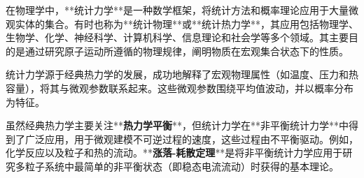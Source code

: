

在物理学中，**统计力学**是一种数学框架，将统计方法和概率理论应用于大量微观实体的集合。有时也称为**统计物理**或**统计热力学**，其应用包括物理学、生物学、化学、神经科学、计算机科学、信息理论和社会学等多个领域。其主要目的是通过研究原子运动所遵循的物理规律，阐明物质在宏观集合状态下的性质。

统计力学源于经典热力学的发展，成功地解释了宏观物理属性（如温度、压力和热容量），将其与微观参数联系起来。这些微观参数围绕平均值波动，并以概率分布为特征。

虽然经典热力学主要关注**\textbf{热力学平衡}**，但统计力学在**非平衡统计力学**中得到了广泛应用，用于微观建模不可逆过程的速度，这些过程由不平衡驱动。例如，化学反应以及粒子和热的流动。**\textbf{涨落-耗散定理}**是将非平衡统计力学应用于研究多粒子系统中最简单的非平衡状态（即稳态电流流动）时获得的基本理论。
